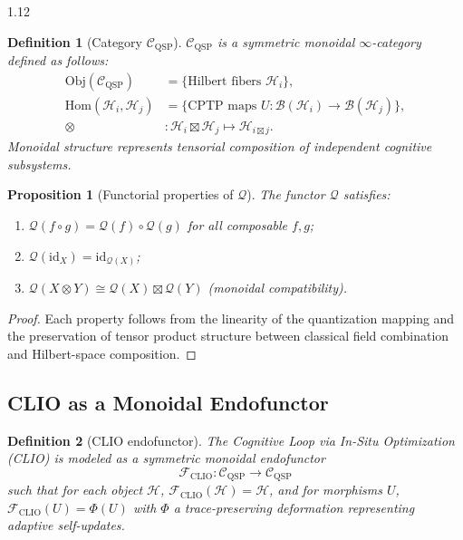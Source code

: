 \documentclass[12pt,a4paper]{article}
\numberwithin{equation}{section}
\newtheorem{definition}{Definition}[section]
\newtheorem{proposition}{Proposition}[section]
\theoremstyle{remark}
\theoremstyle{definition}
\begin{document}
\begin{spacing}{1.12}
\begin{definition}[Category $\mathcal{C}_{\mathrm{QSP}}$]\label{def:F-QSP}
$\mathcal{C}_{\mathrm{QSP}}$ is a symmetric monoidal $\infty$-category defined as follows:
\begin{align*}
\mathrm{Obj}(\mathcal{C}_{\mathrm{QSP}})&=\{\text{Hilbert fibers }\mathcal{H}_i\},\\
\mathrm{Hom}(\mathcal{H}_i,\mathcal{H}_j)&=\{\text{CPTP maps }U:\mathcal{B}(\mathcal{H}_i)\to\mathcal{B}(\mathcal{H}_j)\},\\
\otimes&:\mathcal{H}_i\boxtimes\mathcal{H}_j\mapsto\mathcal{H}_{i\boxtimes j}.
\end{align*}
Monoidal structure represents tensorial composition of independent cognitive subsystems.
\end{definition}

\begin{proposition}[Functorial properties of $\mathcal{Q}$]\label{prop:F-functor}
The functor $\mathcal{Q}$ satisfies:
\begin{enumerate}[label=(\roman*)]
    \item $\mathcal{Q}(f\circ g)=\mathcal{Q}(f)\circ\mathcal{Q}(g)$ for all composable $f,g$;
    \item $\mathcal{Q}(\mathrm{id}_X)=\mathrm{id}_{\mathcal{Q}(X)}$;
    \item $\mathcal{Q}(X\otimes Y)\cong \mathcal{Q}(X)\boxtimes\mathcal{Q}(Y)$ (monoidal compatibility).
\end{enumerate}
\end{proposition}

\begin{proof}
Each property follows from the linearity of the quantization mapping and the preservation of tensor product structure between classical field combination and Hilbert-space composition.
\end{proof}

\subsection{CLIO as a Monoidal Endofunctor}\label{sec:F-clio}

\begin{definition}[CLIO endofunctor]\label{def:F-clio}
The Cognitive Loop via In-Situ Optimization (CLIO) is modeled as a symmetric monoidal endofunctor
\[
\mathcal{F}_{\mathrm{CLIO}}:\mathcal{C}_{\mathrm{QSP}}\to\mathcal{C}_{\mathrm{QSP}}
\]
such that for each object $\mathcal{H}$, $\mathcal{F}_{\mathrm{CLIO}}(\mathcal{H})=\mathcal{H}$, and for morphisms $U$, $\mathcal{F}_{\mathrm{CLIO}}(U)=\Phi(U)$ with $\Phi$ a trace-preserving deformation representing adaptive self-updates.
\end{definition}


\end{spacing}
\end{document}
